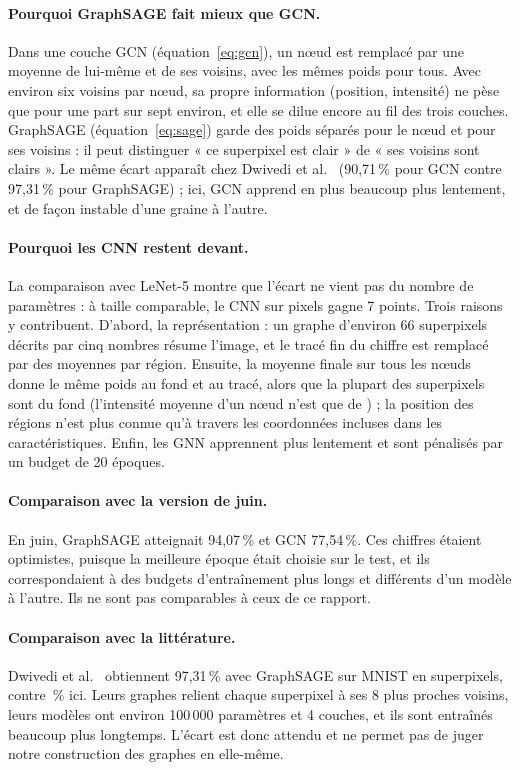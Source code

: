 \documentclass[11pt,a4paper]{article}
\newcommand{\pct}{\,\%}
\begin{document}
\paragraph{Pourquoi GraphSAGE fait mieux que GCN.} Dans une couche GCN (équation~\eqref{eq:gcn}), un nœud
est remplacé par une moyenne de lui-même et de ses voisins, avec les mêmes poids pour tous. Avec environ six
voisins par nœud, sa propre information (position, intensité) ne pèse que pour une part sur sept environ, et elle
se dilue encore au fil des trois couches. GraphSAGE (équation~\eqref{eq:sage}) garde des poids séparés pour le
nœud et pour ses voisins : il peut distinguer « ce superpixel est clair » de « ses voisins sont clairs ». Le même
écart apparaît chez Dwivedi et al.~\cite{dwivedi2023} (90,71\pct{} pour GCN contre 97,31\pct{} pour
GraphSAGE) ; ici, GCN apprend en plus beaucoup plus lentement, et de façon instable d'une graine à l'autre.

\paragraph{Pourquoi les CNN restent devant.} La comparaison avec LeNet-5 montre que l'écart ne vient pas du
nombre de paramètres : à taille comparable, le CNN sur pixels gagne 7 points. Trois raisons y contribuent.
D'abord, la représentation : un graphe d'environ 66 superpixels décrits par cinq nombres résume l'image, et le
tracé fin du chiffre est remplacé par des moyennes par région. Ensuite, la moyenne finale sur tous les nœuds
donne le même poids au fond et au tracé, alors que la plupart des superpixels sont du fond (l'intensité moyenne
d'un nœud n'est que de \fmeanmeanintensity) ; la position des régions n'est plus connue qu'à travers les
coordonnées incluses dans les caractéristiques. Enfin, les GNN apprennent plus lentement et sont pénalisés par
un budget de 20 époques.

\paragraph{Comparaison avec la version de juin.} En juin, GraphSAGE atteignait 94,07\pct{} et GCN 77,54\pct.
Ces chiffres étaient optimistes, puisque la meilleure époque était choisie sur le test, et ils correspondaient à
des budgets d'entraînement plus longs et différents d'un modèle à l'autre. Ils ne sont pas comparables à ceux de
ce rapport.

\paragraph{Comparaison avec la littérature.} Dwivedi et al.~\cite{dwivedi2023} obtiennent 97,31\pct{} avec
GraphSAGE sur MNIST en superpixels, contre \testsage\pct{} ici. Leurs graphes relient chaque superpixel à ses
8 plus proches voisins, leurs modèles ont environ 100\,000 paramètres et 4 couches, et ils sont entraînés
beaucoup plus longtemps. L'écart est donc attendu et ne permet pas de juger notre construction des graphes
en elle-même.
\end{document}
